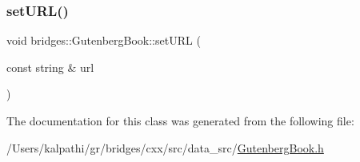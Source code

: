 \subsubsection{\texorpdfstring{setURL()}{setURL()}}
{\footnotesize\ttfamily void bridges\+::\+Gutenberg\+Book\+::set\+U\+RL (\begin{DoxyParamCaption}\item[{const string \&}]{url }\end{DoxyParamCaption})\hspace{0.3cm}{\ttfamily [inline]}}



The documentation for this class was generated from the following file\+:\begin{DoxyCompactItemize}
\item 
/\+Users/kalpathi/gr/bridges/cxx/src/data\+\_\+src/\mbox{\hyperlink{_gutenberg_book_8h}{Gutenberg\+Book.\+h}}\end{DoxyCompactItemize}
